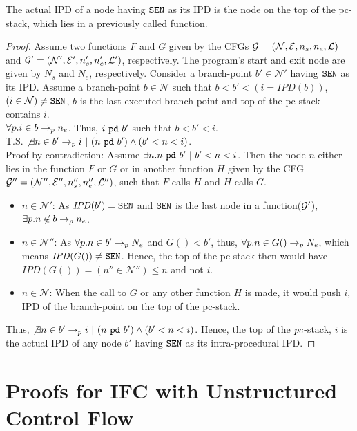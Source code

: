 \begin{myThm}\label{app:thm2:exc}
The actual IPD of a node having $\texttt{SEN}$ as its IPD is the node on
the top of the pc-stack, which lies in a previously called function.
\end{myThm}
\begin{proof}
Assume two functions $F$ and $G$ given by the CFGs $\mathcal{G} =
(\mathcal{N}, \mathcal{E}, n_s, n_e, \mathcal{L})$ and $\mathcal{G}' =
(\mathcal{N}', \mathcal{E}', n'_s, n'_e, \mathcal{L}')$,
respectively. The program's start and exit node are given by $N_s$ and
$N_e$, respectively. Consider a branch-point $b' \in \mathcal{N}'$ having
$\texttt{SEN}$ as its IPD. Assume a branch-point $b \in \mathcal{N}$ such
that $b < b' < (i = \mathit{IPD}(b))$, $(i \in \mathcal{N}) \neq
\texttt{SEN}$, $b$ is the last executed branch-point and 
 top of the pc-stack contains $i$. \\
$\forall p.i \in b \rightarrow_p n_e$. Thus, $i~\texttt{pd}~b'$
such that $b < b' < i$. \\
T.S. $\not\exists n \in b' \rightarrow_p i~|~(n~\texttt{pd}~b')
\wedge (b' < n < i)$. \\
Proof by contradiction:
Assume $\exists n.n~\texttt{pd}~b'~|~b' < n < i$. Then the node $n$ either lies in the
function $F$ or $G$ or in another function $H$ given by the CFG $\mathcal{G}'' =
(\mathcal{N}'', \mathcal{E}'', n''_s, n''_e, \mathcal{L}'')$, such
that $F$ calls $H$ and $H$ calls $G$.
\begin{itemize}
\item $n \in \mathcal{N}'$: As $\mathit{IPD}(b') = \texttt{SEN}$ and $\texttt{SEN}$ is
  the last node in a function($\mathcal{G}'$), $\exists p.n \not\in b \rightarrow_p n_e$. 
\item $n \in \mathcal{N}''$: As $\forall p. n \in b' \rightarrow_p N_e$ and
  $G() < b'$, thus, $\forall p. n \in G() \rightarrow_p N_e$,
  which means $\mathit{IPD}(G()) \neq \texttt{SEN}$. Hence, the top of the
  pc-stack then would have $\mathit{IPD}(G()) = (n'' \in
  \mathcal{N}'') \leq n$ and   not $i$.
\item $n \in \mathcal{N}$: When the call to $G$ or any other
  function $H$ is made, it would push $i$, IPD of the branch-point on
  the top of the  pc-stack.
\end{itemize}
Thus, $\not\exists n \in b' \rightarrow_p i~|~(n~\texttt{pd}~b')
\wedge (b' < n < i)$. Hence, the top of the $\mathit{pc}$-stack, $i$ is the
actual IPD of any node $b'$ having $\texttt{SEN}$ as its intra-procedural IPD. 
\end{proof}

\clearpage
\section{Proofs for IFC with Unstructured Control Flow}
\label{app:exc}

